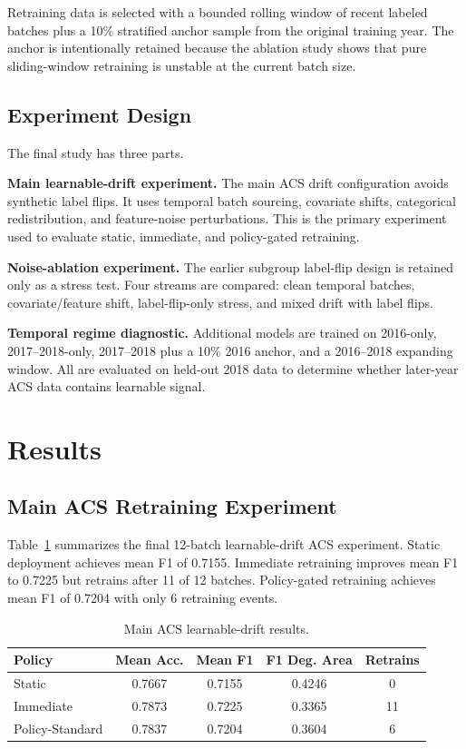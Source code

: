 \documentclass[conference]{IEEEtran}
\begin{document}
Retraining data is selected with a bounded rolling window of recent labeled batches plus a 10\% stratified anchor sample from the original training year. The anchor is intentionally retained because the ablation study shows that pure sliding-window retraining is unstable at the current batch size.

\subsection{Experiment Design}
The final study has three parts.

\textbf{Main learnable-drift experiment.} The main ACS drift configuration avoids synthetic label flips. It uses temporal batch sourcing, covariate shifts, categorical redistribution, and feature-noise perturbations. This is the primary experiment used to evaluate static, immediate, and policy-gated retraining.

\textbf{Noise-ablation experiment.} The earlier subgroup label-flip design is retained only as a stress test. Four streams are compared: clean temporal batches, covariate/feature shift, label-flip-only stress, and mixed drift with label flips.

\textbf{Temporal regime diagnostic.} Additional models are trained on 2016-only, 2017--2018-only, 2017--2018 plus a 10\% 2016 anchor, and a 2016--2018 expanding window. All are evaluated on held-out 2018 data to determine whether later-year ACS data contains learnable signal.

\section{Results}
\subsection{Main ACS Retraining Experiment}
Table~\ref{tab:main_results} summarizes the final 12-batch learnable-drift ACS experiment. Static deployment achieves mean F1 of 0.7155. Immediate retraining improves mean F1 to 0.7225 but retrains after 11 of 12 batches. Policy-gated retraining achieves mean F1 of 0.7204 with only 6 retraining events.

\begin{table}[!t]
\caption{Main ACS learnable-drift results.}
\label{tab:main_results}
\centering
\begin{tabular}{lcccc}
\toprule
\textbf{Policy} & \textbf{Mean Acc.} & \textbf{Mean F1} & \textbf{F1 Deg. Area} & \textbf{Retrains} \\
\midrule
Static & 0.7667 & 0.7155 & 0.4246 & 0 \\
Immediate & 0.7873 & 0.7225 & 0.3365 & 11 \\
Policy-Standard & 0.7837 & 0.7204 & 0.3604 & 6 \\
\bottomrule
\end{tabular}
\end{table}
\end{document}
